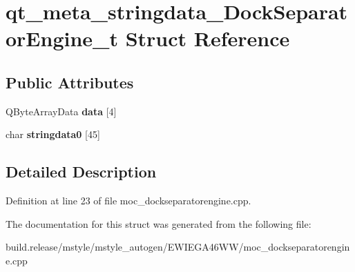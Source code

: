 \hypertarget{structqt__meta__stringdata___dock_separator_engine__t}{}\section{qt\+\_\+meta\+\_\+stringdata\+\_\+\+Dock\+Separator\+Engine\+\_\+t Struct Reference}
\label{structqt__meta__stringdata___dock_separator_engine__t}
\subsection*{Public Attributes}
\begin{DoxyCompactItemize}
\item 
\mbox{\label{structqt__meta__stringdata___dock_separator_engine__t_aee02c2f9bd95fef0e9f7e0f27f031907}} 
Q\+Byte\+Array\+Data {\bfseries data} \mbox{[}4\mbox{]}
\item 
\mbox{\label{structqt__meta__stringdata___dock_separator_engine__t_a19ae25bc823521ebda2c6777e964ab7a}} 
char {\bfseries stringdata0} \mbox{[}45\mbox{]}
\end{DoxyCompactItemize}


\subsection{Detailed Description}


Definition at line 23 of file moc\+\_\+dockseparatorengine.\+cpp.



The documentation for this struct was generated from the following file\+:\begin{DoxyCompactItemize}
\item 
build.\+release/mstyle/mstyle\+\_\+autogen/\+E\+W\+I\+E\+G\+A46\+W\+W/moc\+\_\+dockseparatorengine.\+cpp\end{DoxyCompactItemize}
